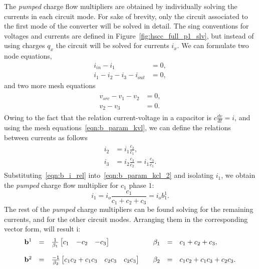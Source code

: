 The \emph{pumped} charge flow multipliers are obtained by individually solving the currents in each circuit mode. For sake of brevity, only the circuit associated to the first mode of the converter will be solved in detail. The sing conventions for voltages and currents are defined in Figure~\ref{fig:hscc_full_p1_slv}, but instead of using charges $q_x$ the circuit will be solved for currents $i_x$. We can formulate two node equations,
\begin{align}
i_{in} - i_1 & = 0, \label{eqn:b_param_kcl_1}\\
i_1  - i_2 - i_3 - i_{out} &=0, \label{eqn:b_param_kcl_2}
\end{align}
and two more mesh equations
\begin{align}
\label{eqn:b_param_kvl}
\begin{split}
  v_{src} - v_1 - v_2  & = 0,\\
  v_2 - v_3&=0.
\end{split}
\end{align}
Owing to the fact that the relation current-voltage in a capacitor is $c \frac{dv}{dt} = i$, and using the mesh equations~\eqref{eqn:b_param_kvl}, we can define the relations between currents as follows
\begin{align}
\label{eqn:b_i_rel}
\begin{split}
  i_2 & = i_1 \frac{c_2}{c_1},\\
  i_3 & = i_2 \frac{c_3}{c_2} = i_1 \frac{c_3}{c_1}.
\end{split}
\end{align}
Substituting~\eqref{eqn:b_i_rel} into~\eqref{eqn:b_param_kcl_2} and isolating $i_1$, we obtain the \emph{pumped} charge flow multiplier for $c_1$ phase $1$:
\begin{equation}
  i_1  = i_o \frac{c_1}{c_1+c_2+c_3} = i_o b_1^1.
\label{eqn:b_c1_p1}
\end{equation}
The rest of the \emph{pumped} charge multipliers can be found solving for the remaining  currents, and for the other circuit modes. Arranging them in the corresponding vector form, will result i:
\begin{equation}
\begin{array}{rclcrcl}
\mathbf{b}^1 &=& \frac{1}{\beta_1}\begin{bmatrix} c_1 & -c_2 & -c_3 \end{bmatrix} & & \beta_1 &=& c_1+c_2+c_3,\\
\\
\mathbf{b}^2 &=& \frac{-1}{\beta_2}\begin{bmatrix} c_1c_2 + c_1c_3 & c_2c_3 &  c_2c_3  \end{bmatrix} & &  \beta_2  &=& c_1c_2+c_1c_3+c_2c_3.
\end{array}
\end{equation}

